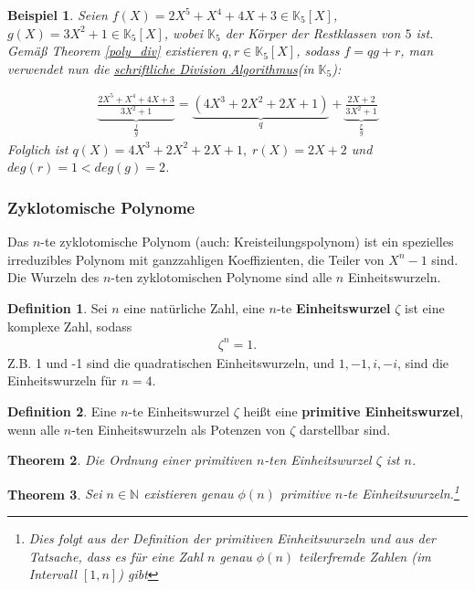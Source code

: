 \documentclass[12pt,oneside]{article}
\newtheorem{theorem}{Theorem}[section]
\newtheorem{example}[theorem]{Beispiel}
\theoremstyle{remark}
\theoremstyle{definition}
\newtheorem{definition}{Definition}[section]
\begin{document}
\begin{example}
Seien $f(X) = 2X^5 + X^4 + 4X + 3 \in \mathbb{K}_5[X]$, $g(X)= 3X^2 + 1 \in \mathbb{K}_5[X]$, wobei $\mathbb{K}_5$ der Körper der Restklassen von $5$ ist. Gemäß Theorem \ref{poly_div} existieren $q,r \in \mathbb{K}_5[X]$, sodass $f = qg + r$, man verwendet nun die \href{poly_div}{schriftliche Division Algorithmus}(in $\mathbb{K}_5$):

\begin{align*}
   \underbrace{\frac{2X^5 + X^4 + 4X + 3}{3X^2 + 1}}_{\frac{f}{g}} = \underbrace{(4X^3 + 2X^2 + 2X + 1) }_{q}+ \underbrace{\frac{2X + 2}{3X^2 + 1}}_{\frac{r}{g}}
\end{align*}
Folglich ist $q(X) = 4X^3 + 2X^2 + 2X + 1, \; r(X) = 2X + 2$ und $deg(r) = 1 < deg(g) = 2 $. 
\end{example}

\subsubsection{Zyklotomische Polynome}
Das $n$-te zyklotomische Polynom (auch: Kreisteilungspolynom) ist ein spezielles irreduzibles Polynom mit ganzzahligen Koeffizienten, die Teiler von $X^n - 1$ sind. Die Wurzeln des $n$-ten zyklotomischen Polynome sind alle $n$ Einheitswurzeln. 

\begin{definition}
Sei $n$ eine natürliche Zahl, eine $n$-te \textbf{Einheitswurzel} $\zeta$ ist eine komplexe Zahl, sodass
\begin{align*}
    \zeta^n = 1.
\end{align*}
Z.B. 1 und -1 sind die quadratischen Einheitswurzeln, und $1, -1, i, -i$, sind die Einheitswurzeln für $n = 4$.    
\end{definition}

\smallskip

\begin{definition}\label{prim_ein}
Eine $n$-te Einheitswurzel $\zeta$ heißt eine \textbf{primitive Einheitswurzel}, wenn alle $n$-ten Einheitswurzeln als Potenzen von $\zeta$ darstellbar sind. 
\end{definition}

\begin{theorem}
Die Ordnung einer primitiven $n$-ten Einheitswurzel $\zeta$ ist $n$.
\end{theorem}

\begin{theorem}
Sei $n \in \mathbb{N}$ existieren genau $\phi(n)$ primitive $n$-te Einheitswurzeln.\footnote{Dies folgt aus der Definition der primitiven Einheitswurzeln und aus der Tatsache, dass es für eine Zahl $n$ genau $\phi(n)$ teilerfremde Zahlen (im Intervall $[1,n]$) gibt  } 
\end{theorem}
\end{document}
